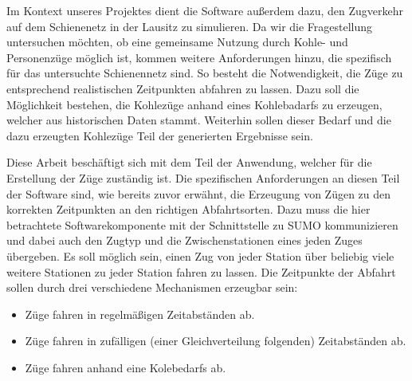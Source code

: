 Im Kontext unseres Projektes dient die Software außerdem dazu, den Zugverkehr auf dem Schienenetz in der Lausitz zu simulieren. Da wir die Fragestellung untersuchen möchten, ob eine gemeinsame Nutzung durch Kohle- und Personenzüge möglich ist, kommen weitere Anforderungen hinzu, die spezifisch für das untersuchte Schienennetz sind. So besteht die Notwendigkeit, die Züge zu entsprechend realistischen Zeitpunkten abfahren zu lassen. Dazu soll die Möglichkeit bestehen, die Kohlezüge anhand eines Kohlebadarfs zu erzeugen, welcher aus historischen Daten stammt. Weiterhin sollen dieser Bedarf und die dazu erzeugten Kohlezüge Teil der generierten Ergebnisse sein.

Diese Arbeit beschäftigt sich mit dem Teil der Anwendung, welcher für die Erstellung der Züge zuständig ist. Die spezifischen Anforderungen an diesen Teil der Software sind, wie bereits zuvor erwähnt, die Erzeugung von Zügen zu den korrekten Zeitpunkten an den richtigen Abfahrtsorten. Dazu muss die hier betrachtete Softwarekomponente mit der Schnittstelle zu SUMO kommunizieren und dabei auch den Zugtyp und die Zwischenstationen eines jeden Zuges übergeben. Es soll möglich sein, einen Zug von jeder Station über beliebig viele weitere Stationen zu jeder Station fahren zu lassen. Die Zeitpunkte der Abfahrt sollen durch drei verschiedene Mechanismen erzeugbar sein:
\begin{itemize}
    \item Züge fahren in regelmäßigen Zeitabständen ab.
    \item Züge fahren in zufälligen (einer Gleichverteilung folgenden) Zeitabständen ab.
    \item Züge fahren anhand eine Kolebedarfs ab.
\end{itemize}
